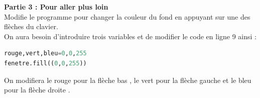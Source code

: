 \documentclass[11pt,a4paper,twoside]{article}
\begin{document}
\noindent \textbf{Partie 3 : Pour aller plus loin}\\

\noindent Modifie le programme pour changer la couleur du fond en appuyant sur une des flèches du clavier.\\On aura besoin d'introduire trois variables et de modifier le code en ligne 9 ainsi :\\
\begin{center}
\begin{minipage}{16cm}
\begin{lstlisting}[language=Python,firstnumber=9]
rouge,vert,bleu=0,0,255
fenetre.fill((0,0,255))
\end{lstlisting}
\end{minipage}
\end{center}
On modifiera le rouge pour la flèche \og bas \fg{}, le vert pour la flèche \og gauche \fg{} et le bleu pour la flèche \og droite \fg{}.
\end{document}
